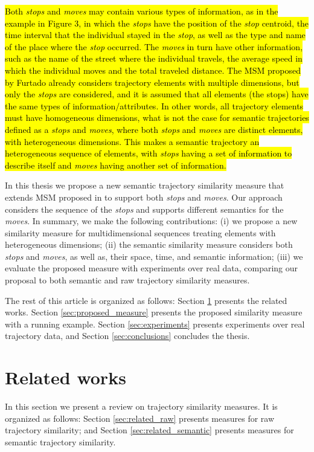 \documentclass[12pt]{article}
\begin{document}
\hl{Both \emph{stops} and \emph{moves} may contain various types of information, as in the example in Figure 3, in which the \emph{stops} have the position of the \emph{stop} centroid, the time interval that the individual stayed in the \emph{stop}, as well as the type and name of the place where the \emph{stop} occurred. The \emph{moves} in turn have other information, such as the name of the street where the individual travels, the average speed in which the individual moves and the total traveled distance. The MSM proposed by Furtado already considers trajectory elements with multiple dimensions, but only the \emph{stops} are considered, and it is assumed that all elements (the stops) have the same types of information/attributes. In other words, all trajectory elements must have homogeneous dimensions, what is not the case for semantic trajectories defined as a \emph{stops} and \emph{moves}, where both \emph{stops} and \emph{moves} are distinct elements, with heterogeneous dimensions. This makes a semantic trajectory an heterogeneous sequence of elements, with \emph{stops} having a set of information to describe itself and \emph{moves} having another set of information.}

In this thesis we propose a new semantic trajectory similarity measure that extends MSM proposed in \cite{Furtado:TGIS12156} to support both \emph{stops} and \emph{moves}. Our approach considers the sequence of the \emph{stops} and supports different semantics for the \emph{moves}. 
In summary, we make the following contributions:
(i) we propose a new similarity measure for multidimensional sequences treating elements with heterogeneous dimensions; (ii) the semantic similarity measure considers both \textit{stops} and \textit{moves}, as well as, their space, time, and semantic information; (iii) we evaluate the proposed measure with experiments over real data, comparing our proposal to both semantic and raw trajectory similarity measures.

The rest of this article is organized as follows: Section \ref{sec:related} presents the related works. Section \ref{sec:proposed_measure} presents the proposed similarity measure with a running example. Section \ref{sec:experiments} presents experiments over real trajectory data, and Section \ref{sec:conclusions} concludes the thesis.

\section{Related works} \label{sec:related}
In this section we present a review on trajectory similarity measures. It is organized as follows: Section \ref{sec:related_raw} presents measures for raw trajectory similarity; and Section \ref{sec:related_semantic} presents measures for semantic trajectory similarity.
\end{document}
